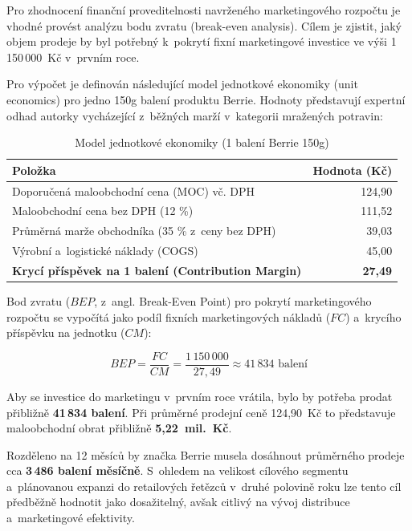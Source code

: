 Pro zhodnocení finanční proveditelnosti navrženého marketingového rozpočtu je vhodné provést analýzu bodu zvratu (break-even analysis). Cílem je zjistit, jaký objem prodeje by byl potřebný k~pokrytí fixní marketingové investice ve výši 1\,150\,000~Kč v~prvním roce.

Pro výpočet je definován následující model jednotkové ekonomiky (unit economics) pro jedno 150g balení produktu Berrie. Hodnoty představují expertní odhad autorky vycházející z~běžných marží v~kategorii mražených potravin:

\begin{table}[H]
\centering
\caption{Model jednotkové ekonomiky (1 balení Berrie 150g)}
\label{tab:unit_economics}
\begin{tabularx}{0.8\textwidth}{Xr}
\toprule
\textbf{Položka} & \textbf{Hodnota (Kč)} \\
\midrule
Doporučená maloobchodní cena (MOC) vč. DPH & 124,90 \\
Maloobchodní cena bez DPH (12 \%) & 111,52 \\
Průměrná marže obchodníka (35 \% z~ceny bez DPH) & 39,03 \\
Výrobní a~logistické náklady (COGS) & 45,00 \\
\midrule
\textbf{Krycí příspěvek na 1 balení (Contribution Margin)} & \textbf{27,49} \\
\bottomrule
\end{tabularx}
\end{table}

Bod zvratu ($BEP$, z~angl. Break-Even Point) pro pokrytí marketingového rozpočtu se vypočítá jako podíl fixních marketingových nákladů ($FC$) a~krycího příspěvku na jednotku ($CM$):

\begin{equation}
BEP = \frac{FC}{CM} = \frac{1\,150\,000}{27,49} \approx 41\,834 \text{ balení}
\end{equation}

Aby se investice do marketingu v~prvním roce vrátila, bylo by potřeba prodat přibližně \textbf{41\,834 balení}. Při průměrné prodejní ceně 124,90~Kč to představuje maloobchodní obrat přibližně \textbf{5,22~mil.~Kč}.

Rozděleno na 12 měsíců by značka Berrie musela dosáhnout průměrného prodeje cca \textbf{3\,486 balení měsíčně}. S~ohledem na velikost cílového segmentu a~plánovanou expanzi do retailových řetězců v~druhé polovině roku lze tento cíl předběžně hodnotit jako dosažitelný, avšak citlivý na vývoj distribuce a~marketingové efektivity.

